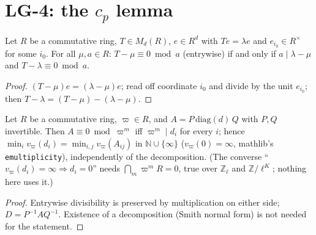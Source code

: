 \section{LG-4: the \texorpdfstring{$c_p$}{c\_p} lemma}

\begin{theorem}\label{thm:lg-cp-core}
  \leanok
  Let $R$ be a commutative ring, $T\in M_d(R)$, $e\in R^d$ with $Te=\lambda e$ and $e_{i_0}\in R^\times$ for some $i_0$.  For all $\mu,a\in R$:
  $T-\mu\equiv0\bmod a$ (entrywise) if and only if $a\mid\lambda-\mu$ and $T-\lambda\equiv0\bmod a$.
\end{theorem}
\begin{proof}
  \leanok
  $(T-\mu)e=(\lambda-\mu)e$; read off coordinate $i_0$ and divide by the unit $e_{i_0}$; then $T-\lambda=(T-\mu)-(\lambda-\mu)$.
\end{proof}

\begin{theorem}\label{thm:lg-cp-smith}
  \leanok
  Let $R$ be a commutative ring, $\varpi\in R$, and $A=P\,\mathrm{diag}(d)\,Q$ with $P,Q$ invertible.  Then $A\equiv0\bmod\varpi^m$ iff
  $\varpi^m\mid d_i$ for every $i$; hence $\min_iv_\varpi(d_i)=\min_{i,j}v_\varpi(A_{ij})$ in $\mathbb N\cup\{\infty\}$ ($v_\varpi(0)=\infty$,
  mathlib's \texttt{emultiplicity}), independently of the decomposition.  (The converse ``$v_\varpi(d_i)=\infty\Rightarrow d_i=0$'' needs
  $\bigcap_m\varpi^mR=0$, true over $\mathbb Z_\ell$ and $\mathbb Z/\ell^K$; nothing here uses it.)
\end{theorem}
\begin{proof}
  \leanok
  Entrywise divisibility is preserved by multiplication on either side; $D=P^{-1}AQ^{-1}$.  Existence of a decomposition (Smith
  normal form) is not needed for the statement.
\end{proof}

